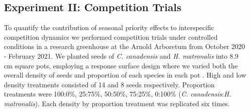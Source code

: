 \documentclass{article}[11pt]
\begin{document}
\subsection*{Experiment II: Competition Trials}
\noindent To quantify the contribution of seasonal priority effects to interspecific competition dynamics we performed competition trials under controlled conditions in a research greenhouse at the Arnold Arboretum from October 2020 - February 2021. %
We planted seeds of \textit{C. canadensis} and \textit{H. matronalis} into 8.9 cm square pots, employing a response surface design where we varied both the overall density of seeds and proportion of each species in each pot \citep{Inouye2001}. High and low density treatments consisted of 14 and 8 seeds respectively. Proportion treatments were 100:0\%, 25:75\%, 50:50\%, 75:25\%, 0:100\% (\textit{C. canadensis}:\textit{H. matronalis}). Each density by proportion treatment was replicated six times. %
\end{document}
